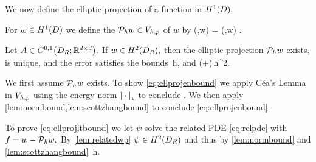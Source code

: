 

We now define the elliptic projection of a function in $\HoD.$%

For $w \in \HoD$ we define the  $\mathcal P_{h} w \in V_{h,p}$ of $w$ by
\beq\label{eq:ellproj}
\api(\vh,\Ph w) = \api(\vh,w) \tfa \vh \in \Vhp.
\eeq
\ede



\label{lem:ellprojbounds}
Let $A \in \CzoDRRRdtd.$ If $w \in \HtDR,$ then the elliptic projection $\mathcal P_{h} w$ exists, is unique, and the error satisfies the bounds
\beq\label{eq:ellprojenbound}
 \lesssim \sqrt{\Amax+\half}\,h,
\eeq
and
\beq\label{eq:ellprojltbound}
 \lesssim  \mleft(\Amax+\half\mright)\CHtell\,h^2.
\eeq
\ele

We first assume $\mathcal P_{h} w$ exists. To show \eqref{eq:ellprojenbound} we apply C\'{e}a's Lemma in $V_{h,p}$ using the energy norm $\Npi{\cdot}$ to conclude
\beqs
{} \leq {}.
\eeqs
We then apply \cref{lem:normbound,lem:scottzhangbound} to conclude \eqref{eq:ellprojenbound}.

To prove \eqref{eq:ellprojltbound} we let $\psi$ solve the related PDE \eqref{eq:relpde} with $f = w-\mathcal P_{h} w.$ By \cref{lem:relatedwp} $\psi \in \HtDR$ and thus by  \cref{lem:normbound} and \cref{lem:scottzhangbound}
\beqs
\Npi{\psi - \Ih \psi} \lesssim \sqrt{\Amax + \half}\CHtell \,h.
\eeqs

